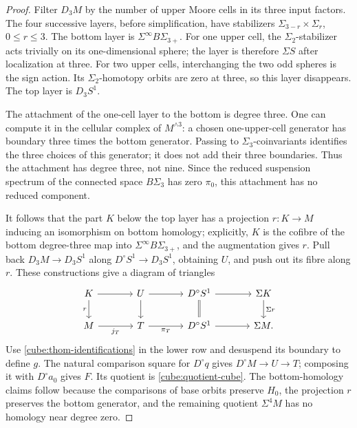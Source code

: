 \documentclass[11pt]{article}
\theoremstyle{definition}
\theoremstyle{remark}
\numberwithin{equation}{section}
\begin{document}
\begin{proof}
Filter \(D_3M\) by the number of upper Moore cells in its
three input factors.  The four successive layers, before
simplification, have stabilizers
\(\Sigma_{3-r}\times\Sigma_r\), \(0\leq r\leq3\).
The bottom layer is \(\Sigma^\infty B\Sigma_{3+}\).
For one upper cell, the \(\Sigma_2\)-stabilizer acts trivially
on its one-dimensional sphere; the layer is therefore
\(\Sigma S\) after localization at three.  For two upper
cells, interchanging the two odd spheres is the sign action.
Its \(\Sigma_2\)-homotopy orbits are zero at three, so this
layer disappears.  The top layer is \(D_3S^1\).

The attachment of the one-cell layer to the bottom is degree
three.  One can compute it in the cellular complex of
\(M^{\wedge3}\): a chosen one-upper-cell generator has
boundary three times the bottom generator.
Passing to \(\Sigma_3\)-coinvariants identifies the three
choices of this generator; it does not add their three
boundaries.  Thus the attachment has degree three, not nine.
Since the reduced suspension spectrum of the connected
space \(B\Sigma_3\) has zero \(\pi_0\), this attachment has
no reduced component.

It follows that the part \(K\) below the top layer has a
projection \(r:K\to M\) inducing an isomorphism on bottom
homology; explicitly, \(K\) is the cofibre of the bottom
degree-three map into \(\Sigma^\infty B\Sigma_{3+}\), and
the augmentation gives \(r\).
Pull back \(D_3M\to D_3S^1\) along
\(D^\circ S^1\to D_3S^1\), obtaining \(U\), and push out
its fibre along \(r\).  These constructions give a diagram
of triangles
\[
\begin{tikzcd}[column sep=large]
 K \arrow[r] \arrow[d,"r"'] &
 U \arrow[r] \arrow[d] &
 D^\circ S^1 \arrow[d,equal] \arrow[r] &
 \Sigma K \arrow[d,"\Sigma r"]\\
 M \arrow[r,"j_T"'] &
 T \arrow[r,"\pi_T"'] &
 D^\circ S^1 \arrow[r] &
 \Sigma M .
\end{tikzcd}
\]
Use \eqref{cube:thom-identifications} in the lower row
and desuspend its boundary to define \(g\).
The natural comparison square for \(D^\circ q\) gives
\(D^\circ M\to U\to T\); composing it with
\(D^\circ a_0\) gives \(F\).
Its quotient is \eqref{cube:quotient-cube}.
The bottom-homology claims follow because the comparisons
of base orbits preserve \(H_0\), the projection \(r\)
preserves the bottom generator, and the remaining quotient
\(\Sigma^4M\) has no homology near degree zero.
\end{proof}
\end{document}
